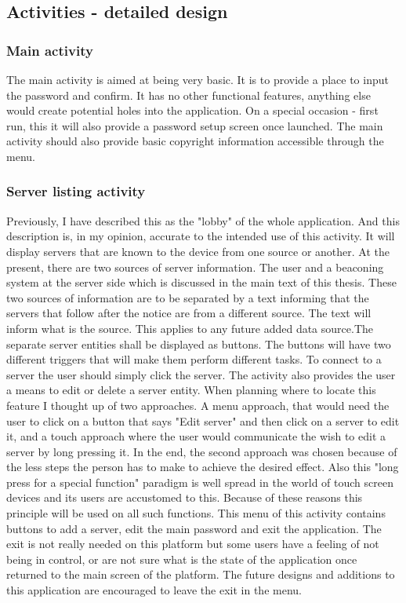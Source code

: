 \documentclass[11pt]{article} %
\begin{document}
\subsection{Activities - detailed design}

\subsubsection{Main activity}
The main activity is aimed at being very basic. It is to provide a place to input the password and confirm. It has no other functional features, anything else would create potential holes into the application. On a special occasion - first run, this it will also provide a password setup screen once launched. The main activity should also provide basic copyright information accessible through the menu.
\subsubsection{Server listing activity}
Previously, I have described this as the "lobby" of the whole application. And this description is, in my opinion, accurate to the intended use of this activity. It will display servers that are known to the device from one source or another. At the present, there are two sources of server information. The user and a beaconing system at the server side which is discussed in the main text of this thesis. These two sources of information are to be separated by a text informing that the servers that follow after the notice are from a different source. The text will inform what is the source. This applies to any future added data source.The separate server entities shall be displayed as buttons. The buttons will have two different triggers that will make them perform different tasks. To connect to a server the user should simply click the server. The activity also provides the user a means to edit or delete a server entity. When planning where to locate this feature I thought up of two approaches. A menu approach, that would need the user to click on a button that says "Edit server" and then click on a server to edit it, and a touch approach where the user would communicate the wish to edit a server by long pressing it. In the end, the second approach was chosen because of the less steps the person has to make to achieve the desired effect. Also this "long press for a special function" paradigm is well spread in the world of touch screen devices and its users are accustomed to this. Because of these reasons this principle will be used on all such functions.
This menu of this activity contains buttons to add a server, edit the main password and exit the application. The exit is not really needed on this platform but some users have a feeling of not being in control, or are not sure what is the state of the application once returned to the main screen of the platform.   The future designs and additions to this application are encouraged to leave the exit in the menu.
\end{document}
